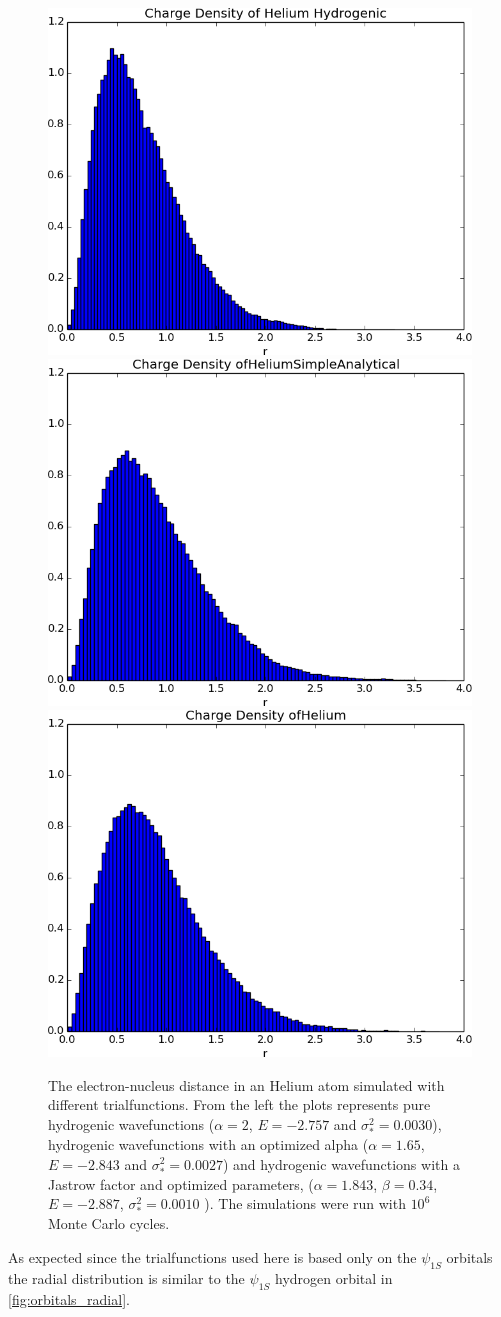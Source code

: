 		\begin{figure}
				\centering 
				\includegraphics[width=0.32\linewidth]{../figures/used/ChargeDensityHeliumHydrogenic}
				\includegraphics[width=0.32\linewidth]{../figures/used/ChargeDensityHeliumSimpleAnalytical}
				\includegraphics[width=0.32\linewidth]{../figures/used/ChargeDensityHelium_trimmed}
				\protect\caption{The electron-nucleus distance in an Helium atom simulated with different trialfunctions. From the left the plots represents pure hydrogenic wavefunctions ($\alpha = 2$, $E = -2.757$ and $\sigma^2_* = 0.0030$), hydrogenic wavefunctions with an optimized alpha ($\alpha = 1.65$, $E = -2.843$ and $\sigma^2_* = 0.0027$) and hydrogenic wavefunctions with a Jastrow factor and optimized parameters, ($\alpha = 1.843$, $\beta = 0.34$, $E = -2.887$, $\sigma^2_* = 0.0010$ ). The simulations were run with \(10^6\) Monte Carlo cycles.}
				\label{fig:HeliumChargeDensity}
		\end{figure}

		As expected since the trialfunctions used here is based only on the \(\psi_{1S}\) orbitals the radial distribution is similar to the \(\psi_{1S}\) hydrogen orbital in \cref{fig:orbitals_radial}.


